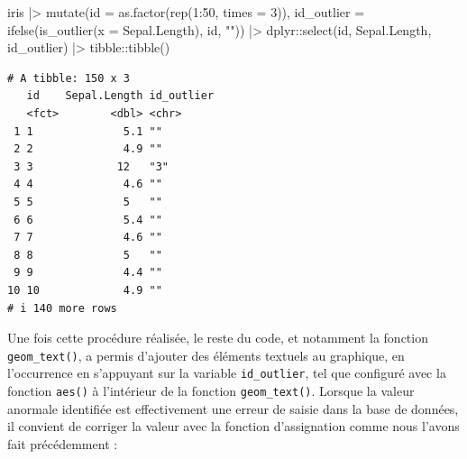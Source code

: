 \documentclass[
  letterpaper,
]{book}
\newenvironment{Shaded}{\begin{snugshade}}{\end{snugshade}}
\newcommand{\AttributeTok}[1]{\textcolor[rgb]{0.40,0.45,0.13}{#1}}
\newcommand{\CommentTok}[1]{\textcolor[rgb]{0.37,0.37,0.37}{#1}}
\newcommand{\DecValTok}[1]{\textcolor[rgb]{0.68,0.00,0.00}{#1}}
\newcommand{\FloatTok}[1]{\textcolor[rgb]{0.68,0.00,0.00}{#1}}
\newcommand{\FunctionTok}[1]{\textcolor[rgb]{0.28,0.35,0.67}{#1}}
\newcommand{\NormalTok}[1]{\textcolor[rgb]{0.00,0.23,0.31}{#1}}
\newcommand{\OtherTok}[1]{\textcolor[rgb]{0.00,0.23,0.31}{#1}}
\newcommand{\SpecialCharTok}[1]{\textcolor[rgb]{0.37,0.37,0.37}{#1}}
\newcommand{\StringTok}[1]{\textcolor[rgb]{0.13,0.47,0.30}{#1}}
\begin{document}
\begin{Shaded}
\begin{Highlighting}[]
\NormalTok{iris }\SpecialCharTok{|\textgreater{}}
  \FunctionTok{mutate}\NormalTok{(}\AttributeTok{id =} \FunctionTok{as.factor}\NormalTok{(}\FunctionTok{rep}\NormalTok{(}\DecValTok{1}\SpecialCharTok{:}\DecValTok{50}\NormalTok{, }\AttributeTok{times =} \DecValTok{3}\NormalTok{)),}
         \AttributeTok{id\_outlier =} \FunctionTok{ifelse}\NormalTok{(}\FunctionTok{is\_outlier}\NormalTok{(}\AttributeTok{x =}\NormalTok{ Sepal.Length), id, }\StringTok{""}\NormalTok{)) }\SpecialCharTok{|\textgreater{}}
\NormalTok{  dplyr}\SpecialCharTok{::}\FunctionTok{select}\NormalTok{(id, Sepal.Length, id\_outlier) }\SpecialCharTok{|\textgreater{}} 
\NormalTok{  tibble}\SpecialCharTok{::}\FunctionTok{tibble}\NormalTok{()}
\end{Highlighting}
\end{Shaded}

\begin{verbatim}
# A tibble: 150 x 3
   id    Sepal.Length id_outlier
   <fct>        <dbl> <chr>     
 1 1              5.1 ""        
 2 2              4.9 ""        
 3 3             12   "3"       
 4 4              4.6 ""        
 5 5              5   ""        
 6 6              5.4 ""        
 7 7              4.6 ""        
 8 8              5   ""        
 9 9              4.4 ""        
10 10             4.9 ""        
# i 140 more rows
\end{verbatim}

Une fois cette procédure réalisée, le reste du code, et notamment la
fonction \texttt{geom\_text()}, a permis d'ajouter des éléments textuels
au graphique, en l'occurrence en s'appuyant sur la variable
\texttt{id\_outlier}, tel que configuré avec la fonction \texttt{aes()}
à l'intérieur de la fonction \texttt{geom\_text()}. Lorsque la valeur
anormale identifiée est effectivement une erreur de saisie dans la base
de données, il convient de corriger la valeur avec la fonction
d'assignation comme nous l'avons fait précédemment :

\begin{Shaded}
\end{Shaded}
\end{document}
